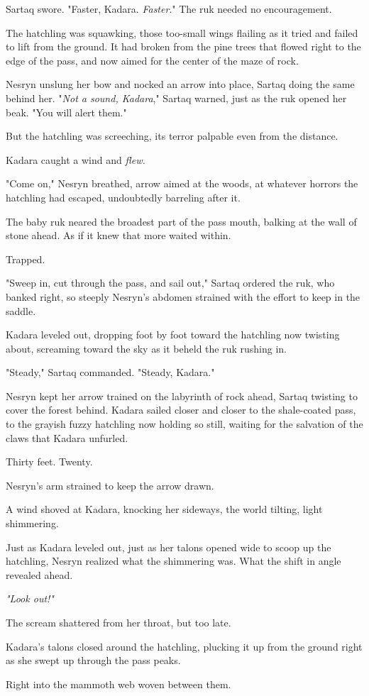 Sartaq swore.
"Faster, Kadara.
\emph{Faster}."
The ruk needed no encouragement.

The hatchling was squawking, those too-small wings flailing as it tried and failed to lift from the ground.
It had broken from the pine trees that flowed right to the edge of the pass, and now aimed for the center of the maze of rock.

Nesryn unslung her bow and nocked an arrow into place, Sartaq doing the same behind her.
"\emph{Not a sound, Kadara}," Sartaq warned, just as the ruk opened her beak.
"You will alert them."

But the hatchling was screeching, its terror palpable even from the distance.

Kadara caught a wind and \emph{flew.}

"Come on," Nesryn breathed, arrow aimed at the woods, at whatever horrors the hatchling had escaped, undoubtedly barreling after it.

The baby ruk neared the broadest part of the pass mouth, balking at the wall of stone ahead.
As if it knew that more waited within.

Trapped.

"Sweep in, cut through the pass, and sail out," Sartaq ordered the ruk, who banked right, so steeply Nesryn's abdomen strained with the effort to keep in the saddle.

Kadara leveled out, dropping foot by foot toward the hatchling now twisting about, screaming toward the sky as it beheld the ruk rushing in.

"Steady," Sartaq commanded.
"Steady, Kadara."

Nesryn kept her arrow trained on the labyrinth of rock ahead, Sartaq twisting to cover the forest behind.
Kadara sailed closer and closer to the shale-coated pass, to the grayish fuzzy hatchling now holding so still, waiting for the salvation of the claws that Kadara unfurled.

Thirty feet.
Twenty.

Nesryn's arm strained to keep the arrow drawn.

A wind shoved at Kadara, knocking her sideways, the world tilting, light shimmering.

Just as Kadara leveled out, just as her talons opened wide to scoop up the hatchling, Nesryn realized what the shimmering was.
What the shift in angle revealed ahead.

\emph{"Look out!"}

The scream shattered from her throat, but too late.

Kadara's talons closed around the hatchling, plucking it up from the ground right as she swept up through the pass peaks.

Right into the mammoth web woven between them.

